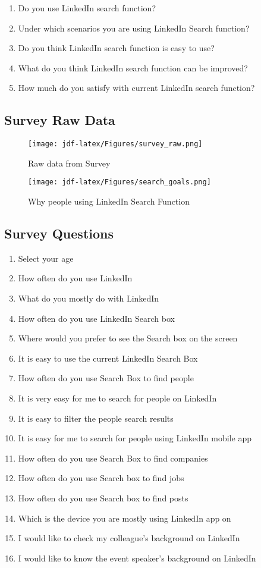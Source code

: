 \documentclass[
	letterpaper, %
]{jdf}
\begin{document}
\begin{enumerate}
    \item Do you use LinkedIn search function?
    \item Under which scenarios you are using LinkedIn Search function?
    \item Do you think LinkedIn search function is easy to use?
    \item What do you think LinkedIn search function can be improved?
    \item How much do you satisfy with current LinkedIn search function?
\end{enumerate}  

\subsection{Survey Raw Data}
\begin{figure}[h]
	\centering
	\texttt{[image: jdf-latex/Figures/survey\_raw.png]}
	\caption{Raw data from Survey}
	\label{fig:survey_raw}
\end{figure}

\begin{figure}[h]
	\centering
	\texttt{[image: jdf-latex/Figures/search\_goals.png]}
	\caption{Why people using LinkedIn Search Function}
	\label{fig:search_goals}
\end{figure}


\subsection{Survey Questions}
\begin{enumerate}
    \item Select your age
    \item How often do you use LinkedIn
    \item What do you mostly do with LinkedIn
    \item How often do you use LinkedIn Search box
    \item Where would you prefer to see the Search box on the screen
    \item It is easy to use the current LinkedIn Search Box
    \item How often do you use Search Box to find people
    \item It is very easy for me to search for people on LinkedIn
    \item It is easy to filter the people search results
    \item It is easy for me to search for people using LinkedIn mobile app
    \item How often do you use Search Box to find companies
    \item How often do you use Search box to find jobs
    \item How often do you use Search box to find posts
    \item Which is the device you are mostly using LinkedIn app on
    \item I would like to check my colleague's background on LinkedIn
    \item I would like to know the event speaker's background on LinkedIn
\end{enumerate}
\end{document}
